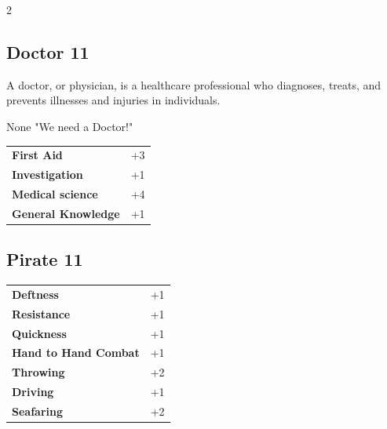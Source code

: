 \begin{multicols}{2}
\begin{tcolorbox}
    \subsection*{Doctor \hfill \small{11 }}
    \tcblower
A doctor, or physician, is a healthcare professional who diagnoses, treats, and prevents illnesses and injuries in individuals.

\begin{pquote}{None}
"We need a Doctor!"
\end{pquote}

\vspace{3mm}

\begin{tabular}{@{}ll@{}}
    \textbf{First Aid} & +3\\
    \textbf{Investigation} & +1\\
    \textbf{Medical science} & +4\\
    \textbf{General Knowledge} & +1\\
\end{tabular}


\end{tcolorbox}

\begin{tcolorbox}
    \subsection*{Pirate \hfill \small{11 }}
    \tcblower




\begin{tabular}{@{}ll@{}}
    \textbf{Deftness} & +1\\
    \textbf{Resistance} & +1\\
    \textbf{Quickness} & +1\\
    \textbf{Hand to Hand Combat} & +1\\
    \textbf{Throwing} & +2\\
    \textbf{Driving} & +1\\
    \textbf{Seafaring} & +2\\
\end{tabular}


\end{tcolorbox}
\end{multicols}
